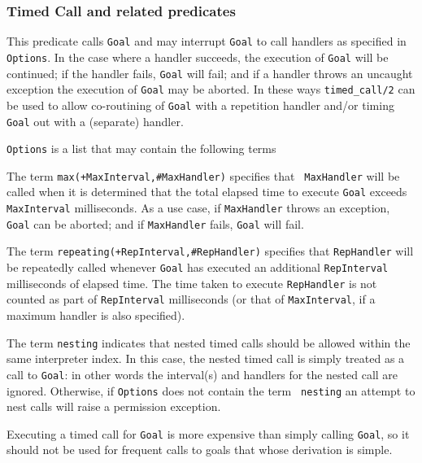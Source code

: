 \subsubsection{Timed Call and related predicates}

\begin{description}
%
This predicate calls {\tt Goal} and may interrupt {\tt Goal} to call
handlers as specified in {\tt Options}.  In the case where a handler
succeeds, the execution of {\tt Goal} will be continued; if the
handler fails, {\tt Goal} will fail; and if a handler throws an
uncaught exception the execution of {\tt Goal} may be aborted. In
these ways {\tt timed\_call/2} can be used to allow co-routining of
{\tt Goal} with a repetition handler and/or timing {\tt Goal} out with
a (separate) handler.

{\tt Options} is a list that may contain the following terms
\bi
\item The term {\tt max(+MaxInterval,\#MaxHandler)} specifies that {\tt
  MaxHandler} will be called when it is determined that the total elapsed
  time to execute {\tt Goal} exceeds {\tt MaxInterval} milliseconds.  As
  a use case, if {\tt MaxHandler} throws an exception, {\tt Goal} can be
  aborted; and if {\tt MaxHandler} fails, {\tt Goal} will fail.
%
\item The term {\tt repeating(+RepInterval,\#RepHandler)} specifies that
  {\tt RepHandler} will be repeatedly called whenever {\tt Goal} has
  executed an additional {\tt RepInterval} milliseconds of elapsed time.
  The time taken to execute {\tt RepHandler} is not counted as part of
  {\tt RepInterval} milliseconds (or that of {\tt MaxInterval}, if a
  maximum handler is also specified).
%
\item The term {\tt nesting} indicates that nested timed calls should
  be allowed within the same interpreter index.  In this case, the
  nested timed call is simply treated as a call to {\tt Goal}: in
  other words the interval(s) and handlers for the nested call are
  ignored.  Otherwise, if {\tt Options} does not contain the term {\tt
    nesting} an attempt to nest calls will raise a permission
  exception.  \ei

Executing a timed call for {\tt Goal} is more expensive than simply
calling {\tt Goal}, so it should not be used for frequent calls to
goals that whose derivation is simple.


\end{description}
